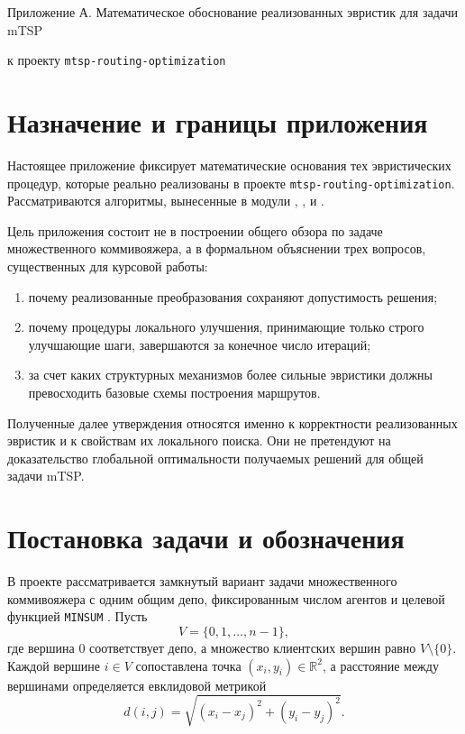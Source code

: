 \documentclass[a4paper,12pt]{article}
\newcommand{\dist}{d}
\newcommand{\clients}{V \setminus \{0\}}
\begin{document}
\begin{center}
{\Large Приложение А. Математическое обоснование реализованных эвристик для задачи mTSP}

\vspace{0.5em}
{\large к проекту \texttt{mtsp-routing-optimization}}
\end{center}

\vspace{1em}

\section{Назначение и границы приложения}

Настоящее приложение фиксирует математические основания тех эвристических процедур, которые
реально реализованы в проекте \texttt{mtsp-routing-optimization}. Рассматриваются алгоритмы,
вынесенные в модули ,
,  и
.

Цель приложения состоит не в построении общего обзора по задаче множественного
коммивояжера, а в формальном объяснении трех вопросов, существенных для курсовой работы:
\begin{enumerate}[label=\arabic*.]
  \item почему реализованные преобразования сохраняют допустимость решения;
  \item почему процедуры локального улучшения, принимающие только строго улучшающие шаги,
  завершаются за конечное число итераций;
  \item за счет каких структурных механизмов более сильные эвристики должны превосходить
  базовые схемы построения маршрутов.
\end{enumerate}

Полученные далее утверждения относятся именно к корректности реализованных эвристик и к
свойствам их локального поиска. Они не претендуют на доказательство глобальной оптимальности
получаемых решений для общей задачи mTSP.

\section{Постановка задачи и обозначения}

В проекте рассматривается замкнутый вариант задачи множественного коммивояжера с одним
общим депо, фиксированным числом агентов и целевой функцией \texttt{MINSUM}
\cite{bektas2006}. Пусть
\[
V = \{0,1,\dots,n-1\},
\]
где вершина \(0\) соответствует депо, а множество клиентских вершин равно \(\clients\).
Каждой вершине \(i \in V\) сопоставлена точка \((x_i,y_i) \in \mathbb{R}^2\), а расстояние
между вершинами определяется евклидовой метрикой
\[
\dist(i,j) = \sqrt{(x_i - x_j)^2 + (y_i - y_j)^2}.
\]
\end{document}
